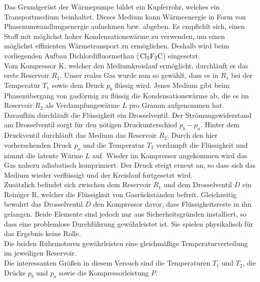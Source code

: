 Das Grundgerüst der Wärmepumpe bildet ein Kupferrohr, welches ein Transportmedium beinhaltet.
Dieses Medium kann Wärmeenergie in Form von Phasenumwandlungsenergie aufnehmen bzw. abgeben.
Es empfiehlt sich, einen Stoff mit möglichst hoher Kondensationswärme zu verwenden, um einen möglichst effizienten Wärmetransport zu ermöglichen.
Deshalb wird beim vorliegenden Aufbau Dichlordifluormethan ($\ce{Cl2F2C}$) eingesetzt.\\
Vom Kompressor K, welcher den Mediumkreislauf ermöglicht, durchläuft es das erste Reservoir $R_1$.
Unser reales Gas wurde nun so gewählt, dass es in $R_1$ bei der Temperatur $T_1$ sowie dem Druck $p_b$ flüssig wird.
Jenes Medium gibt beim Phasenübergang von gasförmig zu flüssig die Kondensationswärme ab, die es im Reservoir $R_2$ als Verdampfungswärme $L$ pro Gramm aufgenommen hat.
Daraufhin durchläuft die Flüssigkeit ein Drosselventil.
Der Strömungswiderstand am Drosselventil sorgt für den nötigen Druckunterschied $p_b-p_a$.
Hinter dem Druckventil durchläuft das Medium das Reservoir $R_2$.
Durch den hier vorherschenden Druck $p_a$ und die Temperatur $T_2$ verdampft die Flüssigkeit und nimmt die latente Wärme $L$ auf.
Wieder im Kompressor angekommen wird das Gas nahezu adiabatisch komprimiert.
Der Druck steigt erneut an, so dass sich das Medium wieder verflüssigt und der Kreislauf fortgesetzt wird.\\
Zusätzlich befindet sich zwischen dem Reservoir $R_1$ und dem Drosselventil $D$ ein Reiniger R, welcher die Flüssigkeit von Gasrückständen befreit.
Gleichzeitig bewahrt das Drosselventil $D$ den Kompressor davor, dass Flüssigkeitsreste in ihn gelangen.
Beide Elemente sind jedoch nur aus Sicherheitsgründen installiert, so dass eine problemlose Durchführung gewährleistet ist.
Sie spielen physikalisch für das Ergebnis keine Rolle.\\
Die beiden Rührmotoren gewährleisten eine gleichmäßige Temperaturverteilung im jeweiligen Reservoir.\\
Die interessanten Größen in diesem Versuch sind die Temperaturen $T_1$ und $T_2$, die Drücke $p_b$ und $p_a$ sowie die Kompressorleistung $P$.

